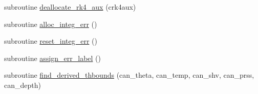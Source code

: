 \begin{DoxyCompactItemize}
\item 
subroutine \hyperlink{namespacerk4__coms_a5af13b35af38a83aed0e367f7053ffc3}{deallocate\+\_\+rk4\+\_\+aux} (crk4aux)
\item 
subroutine \hyperlink{namespacerk4__coms_a8266a2612a37eea2fc3106633e25f954}{alloc\+\_\+integ\+\_\+err} ()
\item 
subroutine \hyperlink{namespacerk4__coms_aa58f2e011f087e610d94022bed90be7a}{reset\+\_\+integ\+\_\+err} ()
\item 
subroutine \hyperlink{namespacerk4__coms_ae49c70a18c8dfa81befa51bc5244ab8c}{assign\+\_\+err\+\_\+label} ()
\item 
subroutine \hyperlink{namespacerk4__coms_a14cd925b1b96d3da7c3b74351101e997}{find\+\_\+derived\+\_\+thbounds} (can\+\_\+theta, can\+\_\+temp, can\+\_\+shv, can\+\_\+prss, can\+\_\+depth)
\end{DoxyCompactItemize}
